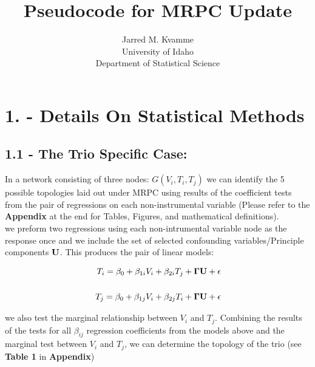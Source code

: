 \documentclass[12pt]{report}
\begin{document}
\begin{titlepage}
\title{Pseudocode for MRPC Update}
\author{ Jarred M. Kvamme \\ University of Idaho \\ Department of Statistical Science }
\maketitle
\end{titlepage}

\newcommand{\indep}{\perp \!\!\! \perp}


\section*{1. - Details On Statistical Methods}
\subsection*{1.1 - The Trio Specific Case:}



In a network consisting of three nodes: $G(V_i, T_i, T_j)$ we can identify the 5 possible topologies laid out under MRPC using results of the coefficient tests from the pair of regressions on each non-instrumental variable (Please refer to the \textbf{Appendix} at the end for Tables, Figures, and mathematical definitions).\\

we preform two regressions using each non-intrumental variable node as the response once and we include the set of selected confounding variables/Principle components $\bf U$. This produces the pair of linear models:

\begin{eqnarray}
T_i = \beta_0 +\beta_{1i}V_i+\beta_{2i}T_j+{\bf \Gamma U}+ \epsilon \\
\nonumber\\
T_j = \beta_0 +\beta_{1j}V_i+\beta_{2j}T_i+{\bf \Gamma U}+ \epsilon 
\end{eqnarray}

we also test the marginal relationship between $V_i$ and $T_j$. Combining the results of the tests for all $\beta_{ij}$ regression coefficients from the models above and the marginal test between $V_i$ and $T_j$, we can determine the topology of the trio (see \textbf{Table 1} in \textbf{Appendix})

\end{document}

